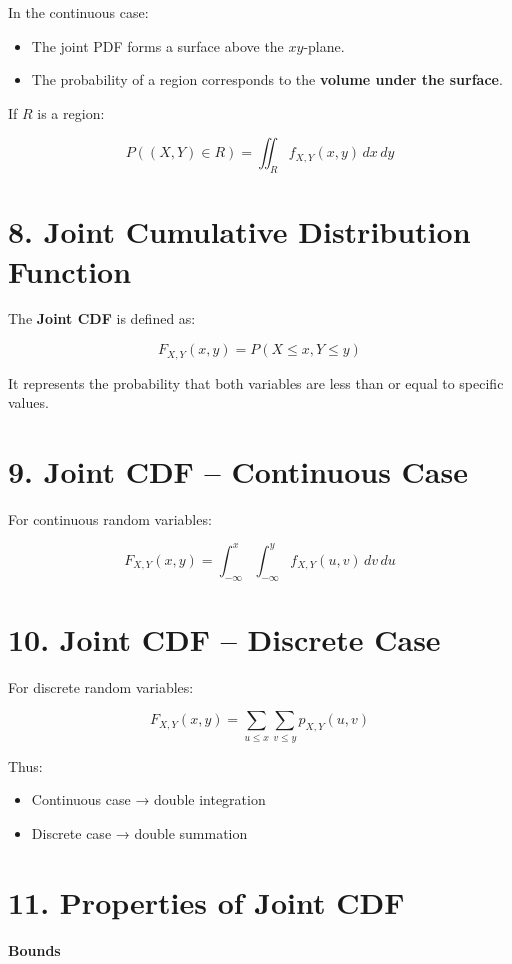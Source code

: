 \documentclass[11pt]{article}
\begin{document}
In the continuous case:

\begin{itemize}
\item The joint PDF forms a surface above the $xy$-plane.
\item The probability of a region corresponds to the \textbf{volume under the surface}.
\end{itemize}

If $R$ is a region:

\[
P((X,Y)\in R)=\iint_R f_{X,Y}(x,y)\,dx\,dy
\]

\section*{8. Joint Cumulative Distribution Function}

The \textbf{Joint CDF} is defined as:

\[
F_{X,Y}(x,y)=P(X\le x, Y\le y)
\]

It represents the probability that both variables are less than or equal to specific values.

\section*{9. Joint CDF – Continuous Case}

For continuous random variables:

\[
F_{X,Y}(x,y)=\int_{-\infty}^{x}\int_{-\infty}^{y} f_{X,Y}(u,v)\,dv\,du
\]

\section*{10. Joint CDF – Discrete Case}

For discrete random variables:

\[
F_{X,Y}(x,y)=\sum_{u\le x}\sum_{v\le y} p_{X,Y}(u,v)
\]

Thus:

\begin{itemize}
\item Continuous case → double integration
\item Discrete case → double summation
\end{itemize}

\section*{11. Properties of Joint CDF}

\textbf{Bounds}
\end{document}

